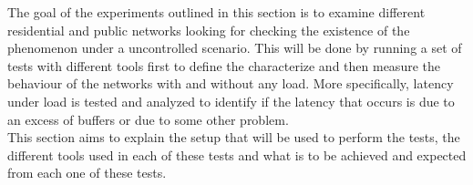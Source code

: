The goal of the experiments outlined in this section is to examine different 
residential and public networks looking for checking the existence of the 
phenomenon under a uncontrolled scenario. This will be done by running a set of 
tests with different tools first to define the characterize and then measure the 
behaviour of the networks with and without any load. More specifically, latency 
under load is tested and analyzed to identify if the latency that occurs is due 
to an excess of buffers or due to some other problem.\\

This section aims to explain the setup that will be used to perform the tests,
the different tools used in each of these tests and what is to be achieved and 
expected from each one of these tests.\\
